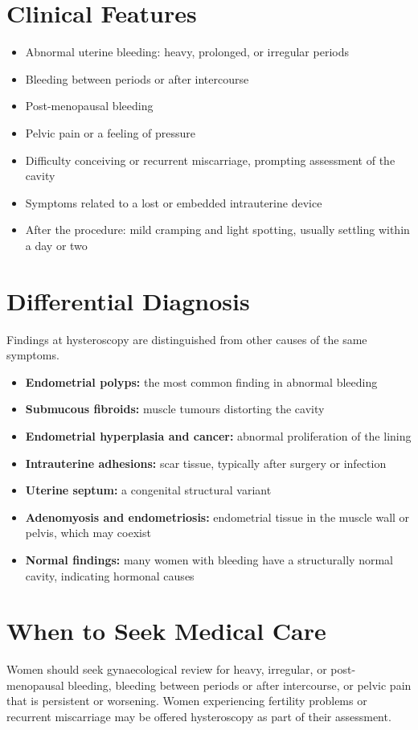 \section*{Clinical Features}
\begin{itemize}
    \item Abnormal uterine bleeding: heavy, prolonged, or irregular periods
    \item Bleeding between periods or after intercourse
    \item Post-menopausal bleeding
    \item Pelvic pain or a feeling of pressure
    \item Difficulty conceiving or recurrent miscarriage, prompting assessment of the cavity
    \item Symptoms related to a lost or embedded intrauterine device
    \item After the procedure: mild cramping and light spotting, usually settling within a day or two
\end{itemize}

\section*{Differential Diagnosis}
Findings at hysteroscopy are distinguished from other causes of the same symptoms.
\begin{itemize}
    \item \textbf{Endometrial polyps:} the most common finding in abnormal bleeding
    \item \textbf{Submucous fibroids:} muscle tumours distorting the cavity
    \item \textbf{Endometrial hyperplasia and cancer:} abnormal proliferation of the lining
    \item \textbf{Intrauterine adhesions:} scar tissue, typically after surgery or infection
    \item \textbf{Uterine septum:} a congenital structural variant
    \item \textbf{Adenomyosis and endometriosis:} endometrial tissue in the muscle wall or pelvis, which may coexist
    \item \textbf{Normal findings:} many women with bleeding have a structurally normal cavity, indicating hormonal causes
\end{itemize}

\section*{When to Seek Medical Care}
Women should seek gynaecological review for heavy, irregular, or post-menopausal bleeding, bleeding between periods or after intercourse, or pelvic pain that is persistent or worsening. Women experiencing fertility problems or recurrent miscarriage may be offered hysteroscopy as part of their assessment.

